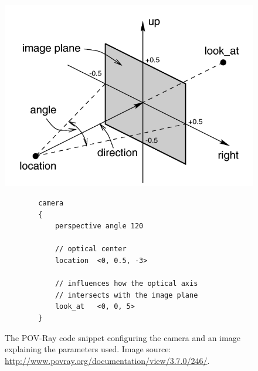 \documentclass[a4paper,twocolumn]{article}
\begin{document}
	\begin{figure}
		\centering
		\includegraphics[width=0.9\columnwidth]{images/povray_camera.png}
		\begin{verbatim}
		camera
		{
		    perspective angle 120
		    
		    // optical center
		    location  <0, 0.5, -3>
		    
		    // influences how the optical axis
		    // intersects with the image plane
		    look_at   <0, 0, 5>
		}
		\end{verbatim}
		\caption{The POV-Ray code snippet configuring the camera and an image explaining the parameters used. Image source: \url{http://www.povray.org/documentation/view/3.7.0/246/}.}
		\label{fig:povray_camera}
	\end{figure}
	
\end{document}
